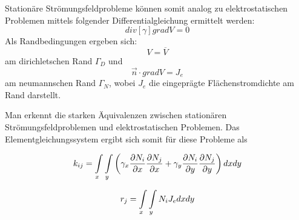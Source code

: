  Stationäre Strömungsfeldprobleme können somit analog zu elektrostatischen Problemen mittels folgender Differentialgleichung ermittelt werden:
 \begin{equation}
\mathit{div}[\gamma]\mathit{grad}V = 0
 \end{equation}
 Als Randbedingungen ergeben sich:
 \begin{equation}
 \label{eq:current_dirichlet_condition}
 V = \overline{V}
 \end{equation}
 am dirichletschen Rand $\Gamma_D$ und 
 \begin{equation}
 \label{eq:current_neumann_condition}
 \vec{n}\cdot\mathit{grad}V = J_e
 \end{equation}
 am neumannschen Rand $\Gamma_N$, wobei $J_e$ die eingeprägte Flächenstromdichte am Rand darstellt.\newline
 
 Man erkennt die starken Äquivalenzen zwischen stationären Strömungsfeldproblemen und elektrostatischen Problemen. Das Elementgleichungssystem ergibt sich somit für diese Probleme als
 
\begin{equation}
\label{eq:k_ij_stat_current}
k_{ij} = \int\displaylimits_{x} \int\displaylimits_{y} \left(\gamma_x \frac{\partial N_i}{\partial x}\frac{\partial N_j}{\partial x} +  \gamma_y\frac{\partial N_i}{\partial y}\frac{\partial N_j}{\partial y}\right)dx dy
\end{equation}

\begin{equation}
\label{eq:right_side_stat_current}
r_j = \int\displaylimits_{x} \int\displaylimits_{y} N_i J_e dx dy
\end{equation}



